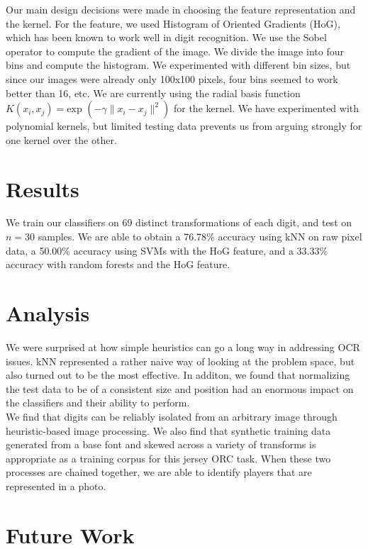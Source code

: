 \documentclass[a4paper]{article}
\begin{document}
Our main design decisions were made in choosing the feature representation and the kernel. For the feature, we used Histogram of Oriented Gradients (HoG), which has been known to work well in digit recognition. We use the Sobel operator to compute the gradient of the image. We divide the image into four bins and compute the histogram. We experimented with different bin sizes, but since our images were already only 100x100 pixels, four bins seemed to work better than 16, etc. We are currently using the radial basis function $K(x_i, x_j) = \mbox{exp }(-\gamma \|x_i - x_j\|^2)$ for the kernel. We have experimented with polynomial kernels, but limited testing data prevents us from arguing strongly for one kernel over the other.

\section{Results}

We train our classifiers on 69 distinct transformations of each digit, and test on $n=30$ samples. We are able to obtain a 76.78\% accuracy using kNN on raw pixel data, a 50.00\% accuracy using SVMs with the HoG feature, and a 33.33\% accuracy with random forests and the HoG feature.

\section{Analysis}

We were surprised at how simple heuristics can go a long way in addressing OCR issues. kNN represented a rather naive way of looking at the problem space, but also turned out to be the most effective. In additon, we found that normalizing the test data to be of a consistent size and position had an enormous impact on the classifiers and their ability to perform. \\ 

We find that digits can be reliably isolated from an arbitrary image through heuristic-based image processing. We also find that synthetic training data generated from a base font and skewed across a variety of transforms is appropriate as a training corpus for this jersey ORC task. When these two processes are chained together, we are able to identify players that are represented in a photo. 

\section{Future Work}

% 
\end{document}
